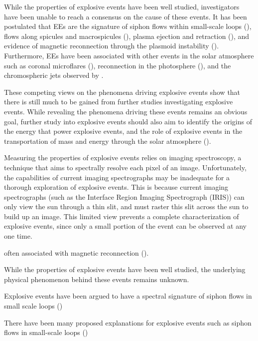 \documentclass[10pt, letter]{article}
\begin{document}
			While the properties of explosive events have been well studied, investigators have been unable to reach a consensus on the cause of these events. It has been postulated that EEs are the signature of siphon flows within small-scale loops (\cite{Teriaca2004}), flows along spicules and macrospicules (\cite{Wilhelm2000}), plasma ejection and retraction (\cite{Huang2014}), and evidence of magnetic reconnection through the plasmoid instability (\cite{Innes2015}). Furthermore, EEs have been associated with other events in the solar atmosphere such as coronal microflares (\cite{Krucker2000}), reconnection in the photosphere (\cite{Tarbell1999}), and the chromospheric jets observed by \cite{DePontieu2011}.
			
			These competing views on the phenomena driving explosive events show that there is still much to be gained from further studies investigating explosive events. While revealing the phenomena driving these events remains an obvious goal, further study into explosive events should also aim to identify the origins of the energy that power explosive events, and the role of explosive events in the transportation of mass and energy through the solar atmosphere (\cite{Huang2014}).
			
			Measuring the properties of explosive events relies on imaging spectroscopy, a technique that aims to spectrally resolve each pixel of an image. Unfortunately, the capabilities of current imaging spectrographs may be inadequate for a thorough exploration of explosive events. This is because current imaging spectrographs (such as the Interface Region Imaging Spectrograph (IRIS)) can only view the sun through a thin slit, and must raster this slit across the sun to build up an image. This limited view prevents a complete characterization of explosive events, since only a small portion of the event can be observed at any one time.
			
			
			
			often associated with magnetic reconnection (\cite{Innes2015}).
			
			While the properties of explosive events have been well studied, the underlying physical phenomenon behind these events remains unknown. 
			
			
			Explosive events have been argued to have a spectral signature of siphon flows in small scale loops (\cite{Teriaca2004})
			
			
			There have been many proposed explanations for explosive events such as
			siphon flows in small-scale loops (\cite{Teriaca2004})
			
\end{document}
